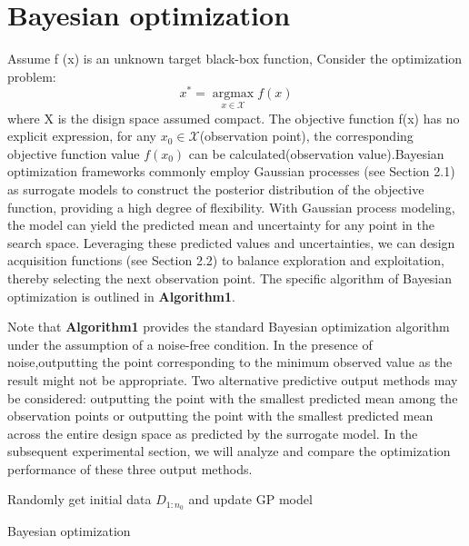 \documentclass{article}
\begin{document}
\section{Bayesian optimization}
\hspace{2em}Assume f (x) is an unknown target black-box function, Consider the optimization problem:
\begin{equation}\label{eq1}
	x^* = \mathop{\arg\max}\limits_{x \in \mathcal{X}} f(x)
\end{equation}
where X is the disign space assumed compact. The objective function f(x) has no explicit expression, for any $x_0 \in \mathcal{X}$(observation point), the corresponding objective function value $f(x_0)$ can be calculated(observation value).Bayesian optimization frameworks commonly employ Gaussian processes (see Section 2.1) as surrogate models to construct the posterior distribution of the objective function, providing a high degree of flexibility. With Gaussian process modeling, the model can yield the predicted mean and uncertainty for any point in the search space. Leveraging these predicted values and uncertainties, we can design acquisition functions (see Section 2.2) to balance exploration and exploitation, thereby selecting the next observation point. The specific algorithm of Bayesian optimization is outlined in \textbf{Algorithm1}.

\hspace{2em}
Note that \textbf{Algorithm1} provides the standard Bayesian optimization algorithm under the assumption of a noise-free condition. In the presence of noise,outputting the point corresponding to the minimum observed value as the result might not be appropriate. Two alternative predictive output methods may be considered: outputting the point with the smallest predicted mean among the observation points or outputting the point with the smallest predicted mean across the entire design space as predicted by the surrogate model. In the subsequent experimental section, we will analyze and compare the optimization performance of these three output methods.
\begin{algorithm}[htb]
    \SetAlgoLined
  
    Randomly get initial data $D_{1:n_0}$ and update GP model\;
    \caption{Bayesian optimization}
\end{algorithm}
\end{document}
